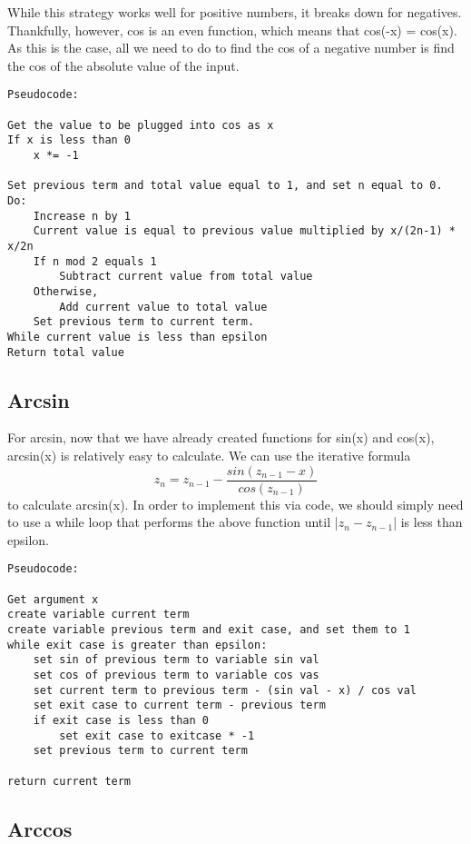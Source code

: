 \documentclass[11pt]{article}
\begin{document}
While this strategy works well for positive numbers, it breaks down for negatives. Thankfully, however, cos is an even function, which means that cos(-x) = cos(x). As this is the case, all we need to do to find the cos of a negative number is find the cos of the absolute value of the input.

\begin{verbatim}
Pseudocode:

Get the value to be plugged into cos as x
If x is less than 0
    x *= -1

Set previous term and total value equal to 1, and set n equal to 0.
Do:
    Increase n by 1
    Current value is equal to previous value multiplied by x/(2n-1) * x/2n
    If n mod 2 equals 1
        Subtract current value from total value
    Otherwise,
        Add current value to total value
    Set previous term to current term.
While current value is less than epsilon
Return total value
\end{verbatim}

\subsection{Arcsin}

For arcsin, now that we have already created functions for sin(x) and cos(x), arcsin(x) is relatively easy to calculate. We can use the iterative formula
\[
z_n = z_{n-1} - \frac {sin(z_{n-1} - x)} {cos(z_{n-1})}
\]
to calculate arcsin(x). In order to implement this via code, we should simply need to use a while loop that performs the above function until |$z_n - z_{n-1}$| is less than epsilon.

\begin{verbatim}
Pseudocode:

Get argument x
create variable current term
create variable previous term and exit case, and set them to 1
while exit case is greater than epsilon:
    set sin of previous term to variable sin val
    set cos of previous term to variable cos vas
    set current term to previous term - (sin val - x) / cos val
    set exit case to current term - previous term
    if exit case is less than 0
        set exit case to exitcase * -1
    set previous term to current term

return current term
\end{verbatim}

\subsection{Arccos}
\end{document}
